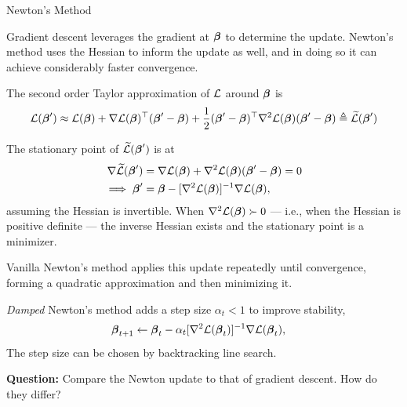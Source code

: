 \documentclass[aspectratio=169]{beamer}
\begin{document}
\begin{frame}[t,allowframebreaks]{Newton's Method}\label{newtons-method}

Gradient descent leverages the gradient at \(\boldsymbol{\beta}\) to determine the
update. Newton's method uses the Hessian to inform the update as well,
and in doing so it can achieve considerably faster convergence.

The second order Taylor approximation of \(\mathcal{L}\) around \(\boldsymbol{\beta}\) is
\begin{align*}
\mathcal{L}(\boldsymbol{\beta}') \approx \mathcal{L}(\boldsymbol{\beta}) + \nabla \mathcal{L}(\boldsymbol{\beta})^\top (\boldsymbol{\beta}' - \boldsymbol{\beta}) + \frac{1}{2} (\boldsymbol{\beta}' - \boldsymbol{\beta})^\top \nabla^2 \mathcal{L}(\boldsymbol{\beta}) (\boldsymbol{\beta}' - \boldsymbol{\beta}) \triangleq \widetilde{\mathcal{L}}(\boldsymbol{\beta}')
\end{align*} 

The stationary point of \(\widetilde{\mathcal{L}}(\boldsymbol{\beta}')\) is at
\begin{align*}
\nabla \widetilde{\mathcal{L}}(\boldsymbol{\beta}') &= \nabla \mathcal{L}(\boldsymbol{\beta}) + \nabla^2 \mathcal{L}(\boldsymbol{\beta}) (\boldsymbol{\beta}' - \boldsymbol{\beta}) = 0 \\
\implies \boldsymbol{\beta}' &= \boldsymbol{\beta} - [\nabla^2 \mathcal{L}(\boldsymbol{\beta})]^{-1} \nabla \mathcal{L}(\boldsymbol{\beta}),
\end{align*} 
assuming the Hessian is invertible. When
\(\nabla^2 \mathcal{L}(\boldsymbol{\beta}) \succ 0\) --- i.e., when the Hessian is positive
definite --- the inverse Hessian exists and the stationary point is a
minimizer.

Vanilla Newton's method applies this update repeatedly until
convergence, forming a quadratic approximation and then minimizing it.

\emph{Damped} Newton's method adds a step size \(\alpha_t < 1\) to
improve stability, \begin{align*}
\boldsymbol{\beta}_{t+1} &\leftarrow \boldsymbol{\beta}_t - \alpha_t [\nabla^2 \mathcal{L}(\boldsymbol{\beta}_t)]^{-1} \nabla \mathcal{L}(\boldsymbol{\beta}_t),
\end{align*} 
The step size can be chosen by backtracking line
search.

\textbf{Question:} Compare the Newton update to that of gradient
descent. How do they differ?

\end{frame}
\end{document}
